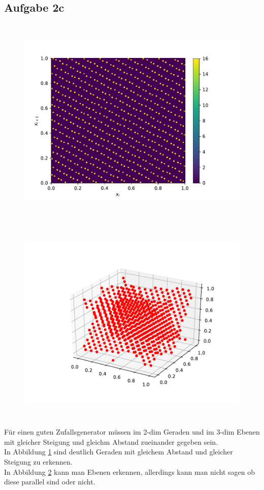\subsection*{Aufgabe 2c}
\begin{figure}
  \includegraphics[height=10cm]{Python/Aufgabe2c1.pdf}
  \label{fig:2c1}
\end{figure}
\begin{figure}
  \includegraphics[height=10cm]{Python/Aufgabe2c2.pdf}
  \label{fig:2c2}
\end{figure}

Für einen guten Zufallsgenerator müssen im 2-dim Geraden und im 3-dim Ebenen mit gleicher Steigung und gleichm Abstand zueinander gegeben sein. \\
In Abbildung \ref{fig:2c1} sind deutlich Geraden mit gleichem Abstand und gleicher Steigung zu erkennen. \\ In Abbildung \ref{fig:2c2} kann man Ebenen erkennen, allerdings kann man nicht sagen ob diese parallel sind oder nicht.


